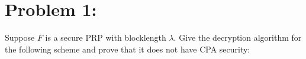 \section{Problem 1:}\label{sec:problem1}

Suppose $F$ is a secure PRP with blocklength $\lambda$. Give the decryption algorithm for the following scheme and prove that it does not have CPA security:

